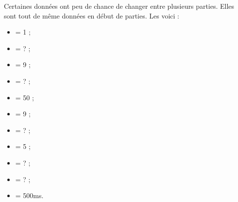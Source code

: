 Certaines données ont peu de chance de changer entre plusieurs parties.
Elles sont tout de même données en début de parties.
Les voici :

\begin{itemize}
    \item \movelen{} = 1 ;
    \item \viewradius{} = ? ;
    \item \bulletamount{} = 9 ;
    \item \shotradius{} = ? ;
    \item \shotsuccess{} = 50 ;
    \item \contagionamount{} = 9 ;
    \item \contagionradius{} = ? ;
    \item \berzerkdelay{} = 5 ;
    \item \berzerkradius{} = ? ;
    \item \attackradius{} = ? ;
    \item \timinglimit{} = 500ms.
\end{itemize}


